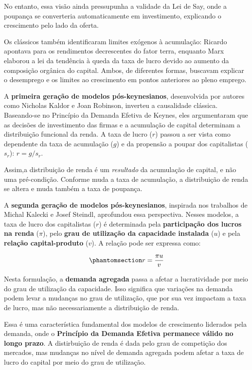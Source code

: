 \documentclass[
  brazilian,
  letterpaper,
  DIV=11,
  numbers=noendperiod]{scrreprt}
\begin{document}
No entanto, essa visão ainda pressupunha a validade da Lei de Say, onde
a poupança se converteria automaticamente em investimento, explicando o
crescimento pelo lado da oferta.

Os clássicos também identificaram limites exógenos à acumulação: Ricardo
apontava para os rendimentos decrescentes do fator terra, enquanto Marx
elaborou a lei da tendência à queda da taxa de lucro devido ao aumento
da composição orgânica do capital. Ambos, de diferentes formas, buscavam
explicar o desemprego e os limites ao crescimento em pontos anteriores
ao pleno emprego.

A \textbf{primeira geração de modelos pós-keynesianos}, desenvolvida por
autores como Nicholas Kaldor e Joan Robinson, inverteu a causalidade
clássica. Baseando-se no Princípio da Demanda Efetiva de Keynes, eles
argumentaram que as decisões de investimento das firmas e a acumulação
de capital determinam a distribuição funcional da renda. A taxa de lucro
(\(r\)) passou a ser vista como dependente da taxa de acumulação (\(g\))
e da propensão a poupar dos capitalistas (\(s_r\)): \(r = g/s_r\).

Assim,a distribuição de renda é um \emph{resultado} da acumulação de
capital, e não uma pré-condição. Conforme muda a taxa de acumulação, a
distribuição de renda se altera e muda também a taxa de poupança.

A \textbf{segunda geração de modelos pós-keynesianos}, inspirada nos
trabalhos de Michal Kalecki e Josef Steindl, aprofundou essa
perspectiva. Nesses modelos, a taxa de lucro dos capitalistas (\(r\)) é
determinada pela \textbf{participação dos lucros na renda} (\(\pi\)),
pelo \textbf{grau de utilização da capacidade instalada} (\(u\)) e pela
\textbf{relação capital-produto} (\(v\)). A relação pode ser expressa
como:

\begin{equation}\protect\phantomsection\label{eq-r}{r = \frac{\pi u}{v}}\end{equation}

Nesta formulação, a \textbf{demanda agregada} passa a afetar a
lucratividade por meio do grau de utilização da capacidade. Isso
significa que variações na demanda podem levar a mudanças no grau de
utilização, que por sua vez impactam a taxa de lucro, mas não
necessariamente a distribuição de renda.

Essa é uma característica fundamental dos modelos de crescimento
liderados pela demanda, onde o \textbf{Princípio da Demanda Efetiva
permanece válido no longo prazo}. A distirbuição de renda é dada pelo
grau de competição dos mercados, mas mudanças no nível de demanda
agregada podem afetar a taxa de lucro do capital por meio do grau de
utilização.
\end{document}
